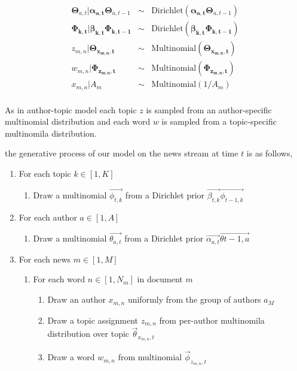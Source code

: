 \begin{eqnarray*} \label{eq:dat}
\boldsymbol{\Theta}_{a,t} | \boldsymbol{\alpha_{a,t}}
\boldsymbol{\Theta}_{a,t-1}
& \sim & \text{Dirichlet}({\boldsymbol{\alpha_{a,t}}
\boldsymbol{\Theta}_{a,t-1}})\\
\boldsymbol{\Phi_{k,t}} | \boldsymbol{\beta_{k,t}}\boldsymbol{\Phi_{k,t-1}} & \sim & \text{Dirichlet}(\boldsymbol{\beta_{k,t}}\boldsymbol{\Phi_{k,t-1}})\\
z_{m,n} | \boldsymbol{\Theta_{x_{m,n},t}} & \sim & \text{Multinomial}(\boldsymbol{\Theta_{x_{m,n},t}})\\
w_{m,n} | \boldsymbol{\Phi_{z_{m,n},t}} & \sim & \text{Multinomial}(\boldsymbol{\Phi_{z_{m,n},t}})\\
x_{m,n} | {A_{m}} & \sim & \text{Multinomial}(1/A_m)\\

\end{eqnarray*}

As in author-topic model each topic $z$ is sampled from an author-specific multinomial distribution and each word $w$ is sampled from a topic-specific multinomila distribution.

the generative process of our model on the news stream at time $t$ is as follows,
\begin{enumerate}
   \item For each topic $k \in [1,K]$
   \begin{enumerate}
     \item Draw a multinomial $\vec{\phi_{t,k}}$ from a Dirichlet prior $\vec{\beta_{t,k}}\vec{\phi_{t-1,k}}$
    \end{enumerate}
   \item For each author $a \in [1,A]$
   \begin{enumerate}
     \item Draw a multinomial $\vec{\theta_{a,t}}$ from a Dirichlet prior $\vec{\alpha_{a,t}}\vec{\theta{t-1,a}}$
    \end{enumerate}
    \item For each news $m \in [1,M]$
   \begin{enumerate}
     \item For each word $n \in [1,N_m]$ in document $m$
     \begin{enumerate}
            \item Draw an author $x_{m,n}$ uniformly from the group of authors $a_M$
            \item Draw a topic assignment $z_{m,n}$ from per-author multinomila distribution over topic $\vec{\theta}_{x_{m, n},t}$ %
            \item Draw a word $w_{m,n}$ from multinomial $\vec{\phi}_{z_{m, n},t}$
    \end{enumerate}
    \end{enumerate}
        
\end{enumerate}


